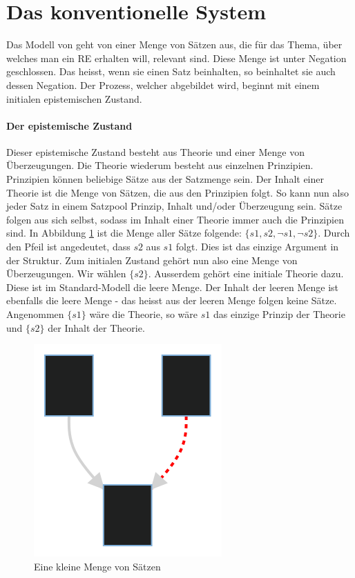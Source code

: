 \documentclass{article}
\begin{document}
\section{Das konventionelle System}

Das Modell von \citeauthor{beisbart_making_2021} geht von einer Menge von Sätzen aus, die für das Thema, über welches man ein RE erhalten will, relevant sind. Diese Menge ist unter Negation geschlossen. Das heisst, wenn sie einen Satz beinhalten, so beinhaltet sie auch dessen Negation.
Der Prozess, welcher abgebildet wird, beginnt mit einem initialen epistemischen Zustand.

\paragraph{Der epistemische Zustand} Dieser epistemische Zustand besteht aus Theorie und einer Menge von Überzeugungen. Die Theorie wiederum besteht aus einzelnen Prinzipien. Prinzipien können beliebige Sätze aus der Satzmenge sein. Der Inhalt einer Theorie ist die Menge von Sätzen, die aus den Prinzipien folgt. So kann nun also jeder Satz in einem Satzpool Prinzip, Inhalt und/oder Überzeugung sein. Sätze folgen aus sich selbst, sodass im Inhalt einer Theorie immer auch die Prinzipien sind. In Abbildung \ref{fig:smallset} ist die Menge aller Sätze folgende: $\{s1,s2,\neg s1, \neg s2\}$. Durch den Pfeil ist angedeutet, dass $s2$ aus $s1$ folgt. Dies ist das einzige Argument in der Struktur. Zum initialen Zustand gehört nun also eine Menge von Überzeugungen. Wir wählen $\{s2\}$. Ausserdem gehört eine initiale Theorie dazu. Diese ist im Standard-Modell die leere Menge. Der Inhalt der leeren Menge ist ebenfalls die leere Menge - das heisst aus der leeren Menge folgen keine Sätze. Angenommen $\{s1\}$ wäre die Theorie, so wäre $s1$ das einzige Prinzip der Theorie und $\{s2\}$ der Inhalt der Theorie.

\begin{figure}[ht]
  \centering
  \includegraphics{figure1}
  \caption{Eine kleine Menge von Sätzen\label{fig:smallset}}
\end{figure}
\end{document}
